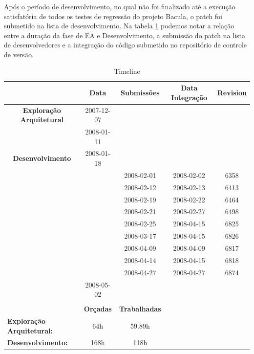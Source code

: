 Após o período de desenvolvimento, no qual não foi finalizado até a execução satisfatória de todos os testes de regressão do projeto Bacula, o patch \patchshort foi submetido na lista de desenvolvimento. Na tabela \ref{Timeline} podemos notar a relação entre a duração da fase de EA e Desenvolvimento, a submissão do patch na lista de desenvolvedores e a integração do código submetido no repositório de controle de versão. 

\begin{table}[h]
\begin{tabular}{|l|c|c|c|c|}
\hline
 & \textbf{Data} & \textbf{Submissões} & \textbf{Data Integração} & \textbf{Revision} \\ \hline
\multicolumn{ 1}{|c|}{\textbf{Exploração Arquitetural}} & 2007-12-07 &  &  &  \\ \cline{ 2- 5}
\multicolumn{ 1}{|l|}{} & 2008-01-11 &  &  &  \\ \hline
\multicolumn{ 1}{|c|}{\textbf{Desenvolvimento}} & 2008-01-18 &  &  &  \\ \cline{ 2- 5}
\multicolumn{ 1}{|l|}{} &  & 2008-02-01 & 2008-02-02 & 6358 \\ \cline{ 2- 5}
\multicolumn{ 1}{|l|}{} &  & 2008-02-12 & 2008-02-13 & 6413 \\ \cline{ 2- 5}
\multicolumn{ 1}{|l|}{} &  & 2008-02-19 & 2008-02-22 & 6464 \\ \cline{ 2- 5}
\multicolumn{ 1}{|l|}{} &  & 2008-02-21 & 2008-02-27 & 6498 \\ \cline{ 2- 5}
\multicolumn{ 1}{|l|}{} &  & 2008-02-25 & 2008-04-15 & 6825 \\ \cline{ 2- 5}
\multicolumn{ 1}{|l|}{} &  & 2008-03-17 & 2008-04-15 & 6826 \\ \cline{ 2- 5}
\multicolumn{ 1}{|l|}{} &  & 2008-04-09 & 2008-04-09 & 6817 \\ \cline{ 2- 5}
\multicolumn{ 1}{|l|}{} &  & 2008-04-14 & 2008-04-15 & 6818 \\ \cline{ 2- 5}
\multicolumn{ 1}{|l|}{} &  & 2008-04-27 & 2008-04-27 & 6874 \\ \cline{ 2- 5}
\multicolumn{ 1}{|l|}{} & 2008-05-02 &  &  &  \\ \hline
 &  &  &  &  \\ \hline
 & \textbf{Orçadas} & \textbf{Trabalhadas} &  &  \\ \hline
\textbf{Exploração Arquitetural:} & 64h & 59.89h &  &  \\ \hline
\textbf{Desenvolvimento:} & 168h & 118h &  &  \\ \hline
\end{tabular}
\caption{Timeline}
\label{Timeline}
\end{table}


